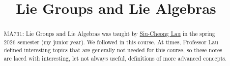 \documentclass[11pt, letterpaper]{report}
\title{Lie Groups and Lie Algebras}
\begin{document}
    \maketitle
    
    \begin{abstract}
	    MA731: Lie Groups and Lie Algebras was taught by \href{https://math.bu.edu/people/lau/Lau/My_geometry_life.html}{Siu-Cheong Lau} in the spring 2026 semester (my junior year). We followed \cite{hall} in this course. At times, Professor Lau defined interesting topics that are generally not needed for this course, so these notes are laced with interesting, let not always useful, definitions of more advanced concepts.
    \end{abstract}
    
    \tableofcontents
    
    
    
    
    
    
    
    
    
    
    
    
    
    
\end{document}
